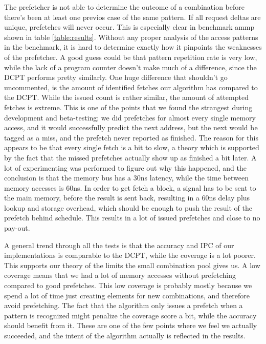 The prefetcher is not able to determine the outcome of a combination before there's been at least one previos case of the same pattern. If all request deltas are unique, prefetches will never occur. This is especially clear in benchmark ammp shown in table \ref{table:results}. Without any proper analysis of the access patterns in the benchmark, it is hard to determine exactly how it pinpoints the weaknesses of the prefetcher. A good guess could be that pattern repetition rate is very low, while the lack of a program counter doesn't make much of a difference, since the DCPT performs pretty similarly. One huge difference that shouldn't go uncommented, is the amount of identified fetches our algorithm has compared to the DCPT. While the issued count is rather similar, the amount of attempted fetches is extreme. This is one of the points that we found the strangest during development and beta-testing; we did prefetches for almost every single memory access, and it would successfully predict the next address, but the next would be tagged as a miss, and the prefetch never reported as finished. The reason for this appears to be that every single fetch is a bit to slow, a theory which is supported by the fact that the missed prefetches actually show up as finished a bit later. A lot of experimenting was performed to figure out why this happened, and the conclusion is that the memory bus has a 30ns latency, while the time between memory accesses is 60ns. In order to get fetch a block, a signal has to be sent to the main memory, before the result is sent back, resulting in a 60ns delay plus lookup and storage overhead, which should be enough to push the result of the prefetch behind schedule. This results in a lot of issued prefetches and close to no pay-out.

A general trend through all the tests is that the accuracy and IPC of our implementations is comparable to the DCPT, while the coverage is a lot poorer. This supports our theory of the limits the small combination pool gives us. A low coverage means that we had a lot of memory accesses without prefetching compared to good prefetches. This low coverage is probably mostly because we spend a lot of time just creating elements for new combinations, and therefore avoid prefetching. The fact that the algorithm only issues a prefetch when a pattern is recognized might penalize the coverage score a bit, while the accuracy should benefit from it. These are one of the few points where we feel we actually succeeded, and the intent of the algorithm actually is reflected in the results. 

